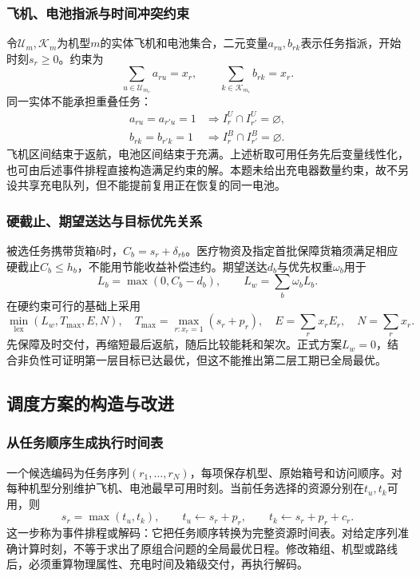 \subsubsection{飞机、电池指派与时间冲突约束}
令$\mathcal U_m,\mathcal K_m$为机型$m$的实体飞机和电池集合，二元变量$a_{ru},b_{rk}$表示任务指派，开始时刻$s_r\ge0$。约束为
\begin{equation}
 \sum_{u\in\mathcal U_{m_r}}a_{ru}=x_r,\qquad
 \sum_{k\in\mathcal K_{m_r}}b_{rk}=x_r.
\label{eq:q2_assignment}
\end{equation}
同一实体不能承担重叠任务：
\begin{equation}
\begin{aligned}
 a_{ru}=a_{r'u}=1&\Rightarrow I_r^U\cap I_{r'}^U=\varnothing,\\
 b_{rk}=b_{r'k}=1&\Rightarrow I_r^B\cap I_{r'}^B=\varnothing.
\end{aligned}
\label{eq:q2_disjoint}
\end{equation}
飞机区间结束于返航，电池区间结束于充满。上述析取可用任务先后变量线性化，也可由后述事件排程直接构造满足约束的解。本题未给出充电器数量约束，故不另设共享充电队列，但不能提前复用正在恢复的同一电池。

\subsubsection{硬截止、期望送达与目标优先关系}
被选任务携带货箱$b$时，$C_b=s_r+\delta_{rb}$。医疗物资及指定首批保障货箱须满足相应硬截止$C_b\le h_b$，不能用节能收益补偿违约。期望送达$d_b$与优先权重$\omega_b$用于
\begin{equation}
 L_b=\max(0,C_b-d_b),\qquad L_w=\sum_b\omega_bL_b.
\label{eq:q2_tardiness}
\end{equation}
在硬约束可行的基础上采用
\begin{equation}
 \min_{\mathrm{lex}}(L_w,T_{\max},E,N),\quad
 T_{\max}=\max_{r:x_r=1}(s_r+p_r),\quad E=\sum_rx_rE_r,\quad N=\sum_rx_r.
\label{eq:q2_objective}
\end{equation}
先保障及时交付，再缩短最后返航，随后比较能耗和架次。正式方案$L_w=0$，结合非负性可证明第一层目标已达最优，但这不能推出第二层工期已全局最优。



\subsection{调度方案的构造与改进}
\subsubsection{从任务顺序生成执行时间表}
一个候选编码为任务序列$(r_1,\ldots,r_N)$，每项保存机型、原始箱号和访问顺序。对每种机型分别维护飞机、电池最早可用时刻。当前任务选择的资源分别在$t_u,t_k$可用，则
\begin{equation}
 s_r=\max(t_u,t_k),\qquad
 t_u\leftarrow s_r+p_r,\qquad t_k\leftarrow s_r+p_r+c_r.
\label{eq:q2_decoder}
\end{equation}
这一步称为事件排程或解码：它把任务顺序转换为完整资源时间表。对给定序列准确计算时刻，不等于求出了原组合问题的全局最优日程。修改箱组、机型或路线后，必须重算物理属性、充电时间及箱级交付，再执行解码。


